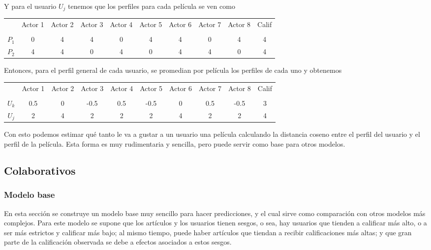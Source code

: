 Y para el usuario $U_j$ tenemos que los perfiles para cada película se ven como

\begin{center}
\begin{tabular}{ c | c  c c c c c c c c}
    & Actor 1 & Actor 2 & Actor 3 & Actor 4 & Actor 5 & Actor 6 & Actor 7 & Actor 8 & Calif \\ \\
  \hline                       
$P_1$ & 0 & 4 & 4 & 0 & 4 & 4 & 0 & 4 & 4 \\
$P_2$ & 4 & 4 & 0 & 4 & 0 & 4 & 4 & 0 & 4 \\
  \hline  
\end{tabular}
\end{center}

Entonces, para el perfil general de cada usuario, se promedian por película los perfiles de cada uno y obtenemos

\begin{center}
\begin{tabular}{ c | c  c c c c c c c c}
    & Actor 1 & Actor 2 & Actor 3 & Actor 4 & Actor 5 & Actor 6 & Actor 7 & Actor 8 & Calif \\ \\
  \hline                       
$U_k$ & 0.5 & 0 & -0.5 & 0.5 & -0.5 & 0 & 0.5 & -0.5 & 3 \\
$U_j$ & 2 & 4 & 2 & 2 & 2 & 4 & 2 & 2 & 4 \\
  \hline  
\end{tabular}
\end{center}

Con esto podemos estimar qué tanto le va a gustar a un usuario una película calculando la distancia coseno entre el perfil del usuario y el perfil de la película. Esta forma es muy rudimentaria y sencilla, pero puede servir como base para otros modelos.

\subsection{Colaborativos}

\subsubsection{Modelo base} \label{sec:modelo_base}

En esta sección se construye un modelo base muy sencillo para hacer predicciones, y el cual sirve como comparación con otros modelos más complejos. Para este modelo se supone que los artículos y los usuarios tienen sesgos, o sea, hay usuarios que tienden a calificar más alto, o a ser más estrictos y calificar más bajo; al mismo tiempo, puede haber artículos que tiendan a recibir calificaciones más altas; y que gran parte de la calificación observada se debe a efectos asociados a estos sesgos.

